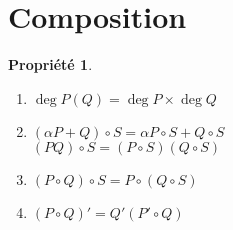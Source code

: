 \documentclass[fleqn]{article}
\theoremstyle{definition} \newtheorem*{defi}{D\'efinition}
\theoremstyle{definition} \newtheorem*{theo}{Th\'eor\`eme}
\theoremstyle{definition} \newtheorem*{coro}{Corollaire}
\theoremstyle{definition} \newtheorem*{nota}{Notation}
\theoremstyle{remark} \newtheorem*{rqs}{Remarques}
\theoremstyle{definition} \newtheorem*{prop}{Propri\'et\'e}
\begin{document}
\section{Composition}
\begin{prop} $ $
	\begin{enumerate}
		\item $\deg P(Q) = \deg P \times \deg Q$
		\item $(\alpha P + Q) \circ S = \alpha P \circ S + Q \circ S$ \\
				$(PQ) \circ S = (P \circ S)(Q \circ S)$
		\item $(P\circ Q) \circ S = P \circ (Q \circ S)$
		\item $(P \circ Q)' = Q' (P' \circ Q)$
	\end{enumerate}
\end{prop}
\end{document}
